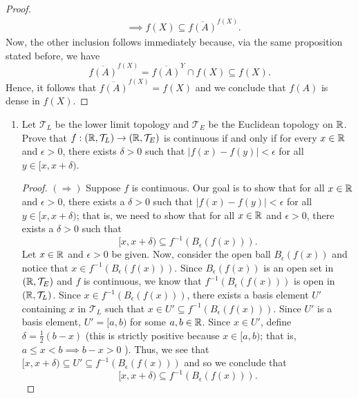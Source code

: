 \documentclass[a4paper]{article}
\begin{document}
\begin{problem}
\begin{enumerate}
\begin{proof}
\begin{align*}
                                                                    &\implies f(X) \subseteq \overline{f(A)}^{f(X)}.
           \end{align*}
           Now, the other inclusion follows immediately because, via the same proposition stated before, we have  
           \[ \overline{f(A)}^{f(X)} = \overline{f(A)}^{Y} \cap f(X) \subseteq f(X).  \]
           Hence, it follows that \( \overline{f(A)}^{f(X)} = f(X) \) and we conclude that \( f(A) \) is dense in \( f(X) \).
           \end{proof}
   \end{enumerate}
\end{problem}

\begin{problem}
   \begin{enumerate}
       \item[(i)] Let \( {\mathcal{T}}_{L} \) be the lower limit topology and \( {\mathcal{T}}_{E} \) be the Euclidean topology on \( \mathbb{R}  \). Prove that \( f: (\mathbb{R} , {\mathcal{T}}_{L}) \to (\mathbb{R} , {\mathcal{T}}_{E}) \) is continuous if and only if for every \( x \in \mathbb{R}  \) and \( \epsilon > 0  \), there exists \( \delta > 0  \) such that \( | f(x) - f(y) |  < \epsilon  \) for all \( y \in [x,x+\delta) \).
           \begin{proof}
               \( (\Longrightarrow) \) Suppose \( f \) is continuous. Our goal is to show that for all \( x \in \mathbb{R}  \) and \( \epsilon > 0  \), there exists a \( \delta > 0  \) such that \( | f(x) - f(y) |  < \epsilon  \) for all \( y \in [x,x+\delta) \); that is, we need to show that for all \( x \in \mathbb{R}  \) and \( \epsilon > 0 \), there exists a \( \delta > 0 \) such that  
               \[  [x,x+\delta) \subseteq f^{-1}({B}_{\epsilon}(f(x))). \]
               Let \( x \in \mathbb{R}  \) and \( \epsilon > 0  \) be given. Now, consider the open ball \( {B}_{\epsilon}(f(x)) \) and notice that \( x \in f^{-1}({B}_{\epsilon}(f(x))) \). Since \( {B}_{\epsilon}(f(x)) \) is an open set in \( (\mathbb{R}, {\mathcal{T}}_{E}) \) and \( f  \) is continuous, we know that \( f^{-1}({B}_{\epsilon}(f(x))) \) is open in \( (\mathbb{R} , {\mathcal{T}}_{L}) \). Since \( x \in f^{-1}({B}_{\epsilon}(f(x)))  \), there exists a basis element \( U' \) containing \( x  \) in \( {\mathcal{T}}_{L} \) such that \( x \in U' \subseteq  f^{-1}({B}_{\epsilon}(f(x))) \). Since \( U' \) is a basis element, \( U' = [a,b) \) for some \( a,b \in \mathbb{R} \). Since \( x \in U' \), define \( \delta = \frac{ 1 }{ 2 }  (b - x) \) (this is strictly positive because \( x \in [a,b) \); that is, \( a \leq x < b \implies b - x > 0  \) ). Thus, we see that \( [x, x + \delta) \subseteq U' \subseteq f^{-1}({B}_{\epsilon}(f(x))) \) and so we conclude that  
               \[  [x,x+\delta) \subseteq f^{-1}({B}_{\epsilon}(f(x))). \]


\end{proof}
\end{enumerate}
\end{problem}
\end{document}
